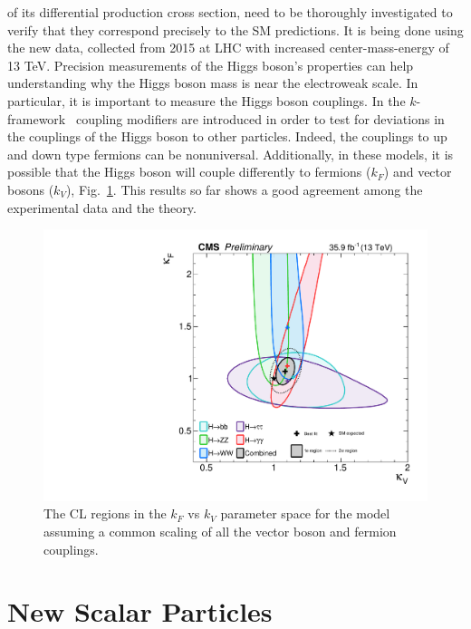 of its differential production cross section, need to be thoroughly investigated to verify
that they correspond precisely to the SM predictions. It is being done using the new data, collected from 2015 at LHC with  increased center-mass-energy of 13 TeV.
Precision measurements of the Higgs boson’s properties can help understanding   why the Higgs
boson mass is near the electroweak scale. In particular, it is important to measure the  Higgs boson  couplings. In the $k$-framework~\cite{Heinemeyer:2013tqa}  coupling modifiers are introduced in order to test for deviations in the couplings of the Higgs boson to other particles.  
Indeed, the couplings to up and down type fermions can be nonuniversal.  Additionally, in these models,
it is possible that the Higgs boson will couple differently to fermions ($k_F$) and vector bosons ($k_V$), Fig.~\ref{Figure_016}. This results so far shows a good agreement among the experimental  data and the theory.
\begin{figure}
\centering
\includegraphics[scale= 0.5]{../Cap1/Figure_016}
\caption{The  CL regions in the $k_F$ vs $k_V$ parameter space for the model assuming a common scaling of all the vector boson and fermion couplings.}
\label{Figure_016}
\end{figure}  




\section{New Scalar Particles}
\label{NSP}


